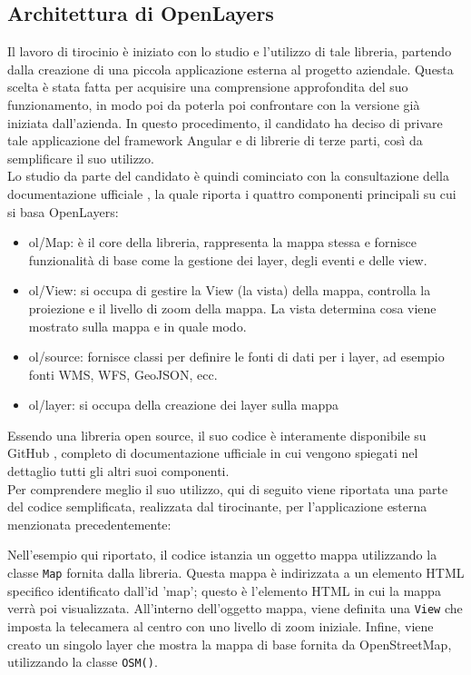 \subsection{Architettura di OpenLayers}

Il lavoro di tirocinio è iniziato con lo studio e l'utilizzo di tale libreria, partendo dalla creazione di una piccola applicazione esterna al progetto aziendale. Questa scelta è stata fatta per acquisire una comprensione approfondita del suo funzionamento, in modo poi da poterla poi confrontare con la versione già iniziata dall'azienda. In questo procedimento, il candidato ha deciso di privare tale applicazione del framework Angular e di librerie di terze parti, così da semplificare il suo utilizzo.
\\Lo studio da parte del candidato è quindi cominciato con la consultazione della documentazione ufficiale \cite{DocumentazioneOpenLayersBase}, la quale riporta i quattro componenti principali su cui si basa OpenLayers:
\begin{itemize}
    \item ol/Map: è il core della libreria, rappresenta la mappa stessa e fornisce funzionalità di base come la gestione dei layer, degli eventi e delle view.
    \item ol/View: si occupa di gestire la View (la vista) della mappa, controlla la proiezione e il livello di zoom della mappa. La vista determina cosa viene mostrato sulla mappa e in quale modo.
    \item ol/source: fornisce classi per definire le fonti di dati per i layer, ad esempio fonti WMS, WFS, GeoJSON, ecc.
    \item ol/layer: si occupa della creazione dei layer sulla mappa
\end{itemize}
Essendo una libreria open source, il suo codice è interamente disponibile su GitHub \cite{GithubOpenLayers}, completo di documentazione ufficiale in cui vengono spiegati nel dettaglio tutti gli altri suoi componenti.
\\Per comprendere meglio il suo utilizzo, qui di seguito viene riportata una parte del codice semplificata, realizzata dal tirocinante, per l'applicazione esterna menzionata precedentemente:


Nell'esempio qui riportato, il codice istanzia un oggetto mappa utilizzando la classe \verb|Map| fornita dalla libreria. Questa mappa è indirizzata a un elemento HTML specifico identificato dall'id 'map';  questo è l'elemento HTML in cui la mappa verrà poi visualizzata. All'interno dell'oggetto mappa, viene definita una \verb|View| che imposta la telecamera al centro con uno livello di zoom iniziale. Infine, viene creato un singolo layer che mostra la mappa di base fornita da OpenStreetMap, utilizzando la classe \verb|OSM()|.

